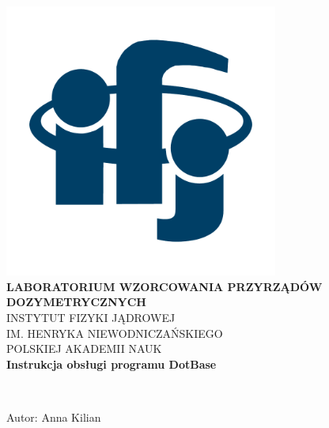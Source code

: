 
\begin{center}
\includegraphics[width=9cm]{obrazki/logo_ifj_kolor2.pdf}\\[9mm]
{\Large \textbf{LABORATORIUM WZORCOWANIA PRZYRZĄDÓW DOZYMETRYCZNYCH}}\\[5mm]
INSTYTUT FIZYKI JĄDROWEJ\\
IM. HENRYKA NIEWODNICZAŃSKIEGO\\
POLSKIEJ AKADEMII NAUK\\[8mm]
{\Large \textbf{Instrukcja obsługi programu DotBase}}\\[8mm]
\end{center}

~

\begin{flushright}
	Autor: Anna Kilian 
\end{flushright}

\czystastopka
{}

\pagebreak


\czystastopka

\pagebreak